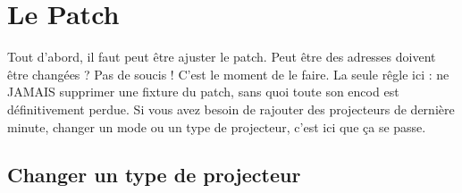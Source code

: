 \section{Le Patch}
\label{sec:adapter_patch}

Tout d'abord, il faut peut être ajuster le patch. Peut être des adresses doivent être changées ? Pas de soucis ! C'est le moment de le faire.
\newline
La seule rêgle ici : ne JAMAIS supprimer une fixture du patch, sans quoi toute son encod est définitivement perdue.
\newline
Si vous avez besoin de rajouter des projecteurs de dernière minute, changer un mode ou un type de projecteur, c'est ici que ça se passe.

\subsection{Changer un type de projecteur}
\label{subsec:fixture_morph}

